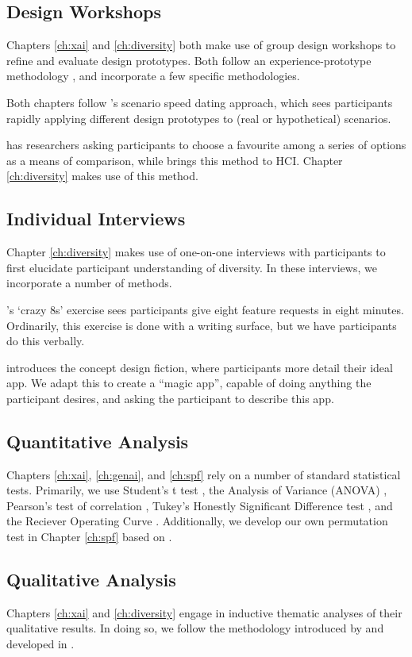 \subsection{Design Workshops}
Chapters \ref{ch:xai} and \ref{ch:diversity} both make use of group design workshops to refine and evaluate design prototypes. Both follow an experience-prototype methodology \cite{Buchenau_Suri_2000}, and incorporate a few specific methodologies.

Both chapters follow \textcite{Zimmerman_Forlizzi_2017}'s scenario speed dating approach, which sees participants rapidly applying different design prototypes to (real or hypothetical) scenarios.

\textcite{Gatian_1994} has researchers asking participants to choose a favourite among a series of options as a means of comparison, while \textcite{Griffiths_Johnson_Hartley_2007} brings this method to HCI. Chapter \ref{ch:diversity} makes use of this method.

\subsection{Individual Interviews}
Chapter \ref{ch:diversity} makes use of one-on-one interviews with participants to first elucidate participant understanding of diversity. In these interviews, we incorporate a number of methods.

\textcite{Knapp_Zeratzky_Kowitz_2016}'s `crazy 8s' exercise sees participants give eight feature requests in eight minutes. Ordinarily, this exercise is done with a writing surface, but we have participants do this verbally.

\textcite{blythe2014research} introduces the concept design fiction, where participants more detail their ideal app. We adapt this to create a ``magic app'', capable of doing anything the participant desires, and asking the participant to describe this app.

\subsection{Quantitative Analysis}
Chapters \ref{ch:xai}, \ref{ch:genai}, and \ref{ch:spf} rely on a number of standard statistical tests. Primarily, we use Student's t test \cite{citation needed}, the Analysis of Variance (ANOVA) \cite{citation needed}, Pearson's test of correlation \cite{citation needed}, Tukey's Honestly Significant Difference test \cite{citation needed}, and the Reciever Operating Curve \cite{citation needed}. Additionally, we develop our own permutation test in Chapter \ref{ch:spf} based on \textcite{citation needed}.

\subsection{Qualitative Analysis}
Chapters \ref{ch:xai} and \ref{ch:diversity} engage in inductive thematic analyses of their qualitative results. In doing so, we follow the methodology introduced by \textcite{braun_using_2006} and developed in \textcite{braun_conceptual_2022,braun_toward_2023,noauthor_thematic_nodate}.